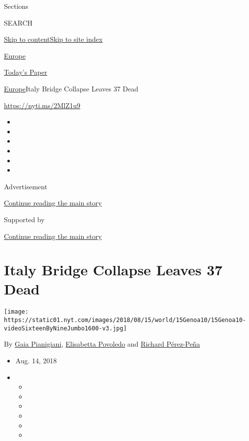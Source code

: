 Sections

SEARCH

\protect\hyperlink{site-content}{Skip to
content}\protect\hyperlink{site-index}{Skip to site index}

\href{https://www.nytimes.com/section/world/europe}{Europe}

\href{https://myaccount.nytimes.com/auth/login?response_type=cookie\&client_id=vi}{}

\href{https://www.nytimes.com/section/todayspaper}{Today's Paper}

\href{/section/world/europe}{Europe}\textbar{}Italy Bridge Collapse
Leaves 37 Dead

\url{https://nyti.ms/2MlZ1u9}

\begin{itemize}
\item
\item
\item
\item
\item
\item
\end{itemize}

Advertisement

\protect\hyperlink{after-top}{Continue reading the main story}

Supported by

\protect\hyperlink{after-sponsor}{Continue reading the main story}

\hypertarget{italy-bridge-collapse-leaves-37-dead}{%
\section{Italy Bridge Collapse Leaves 37
Dead}\label{italy-bridge-collapse-leaves-37-dead}}

\texttt{[image: https://static01.nyt.com/images/2018/08/15/world/15Genoa10/15Genoa10-videoSixteenByNineJumbo1600-v3.jpg]}

By \href{https://www.nytimes.com/by/gaia-pianigiani}{Gaia Pianigiani},
\href{https://www.nytimes.com/by/elisabetta-povoledo}{Elisabetta
Povoledo} and
\href{https://www.nytimes.com/by/richard-perez-pena}{Richard Pérez-Peña}

\begin{itemize}
\item
  Aug. 14, 2018
\item
  \begin{itemize}
  \item
  \item
  \item
  \item
  \item
  \item
  \end{itemize}
\end{itemize}

